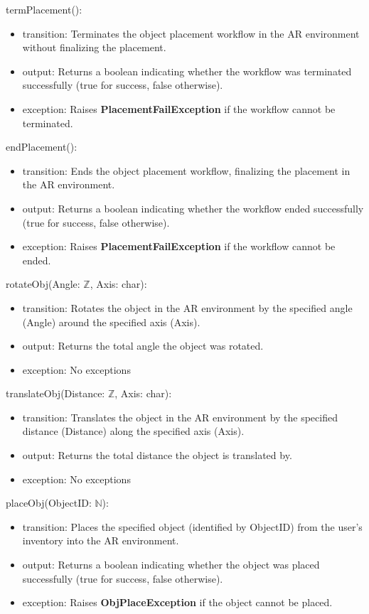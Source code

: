 \documentclass[12pt, titlepage]{article}
\begin{document}
\noindent termPlacement():
\begin{itemize}
\item transition: Terminates the object placement workflow in the AR environment without finalizing the placement.
\item output: Returns a boolean indicating whether the workflow was terminated successfully (true for success, false otherwise).
\item exception: Raises \textbf{PlacementFailException} if the workflow cannot be terminated.
\end{itemize}

\noindent endPlacement():
\begin{itemize}
\item transition: Ends the object placement workflow, finalizing the placement in the AR environment.
\item output: Returns a boolean indicating whether the workflow ended successfully (true for success, false otherwise).
\item exception: Raises \textbf{PlacementFailException} if the workflow cannot be ended.
\end{itemize}

\noindent rotateObj(Angle: $\mathbb{Z}$, Axis: char):
\begin{itemize}
\item transition: Rotates the object in the AR environment by the specified angle (Angle) around the specified axis (Axis).
\item output: Returns the total angle the object was rotated.
\item exception: No exceptions
\end{itemize}

\noindent translateObj(Distance: $\mathbb{Z}$, Axis: char):
\begin{itemize}
\item transition: Translates the object in the AR environment by the specified distance (Distance) along the specified axis (Axis).
\item output: Returns the total distance the object is translated by.
\item exception: No exceptions
\end{itemize}

\noindent placeObj(ObjectID: $\mathbb{N}$):
\begin{itemize}
\item transition: Places the specified object (identified by ObjectID) from the user's inventory into the AR environment.
\item output: Returns a boolean indicating whether the object was placed successfully (true for success, false otherwise).
\item exception: Raises \textbf{ObjPlaceException} if the object cannot be placed.
\end{itemize}
\end{document}
